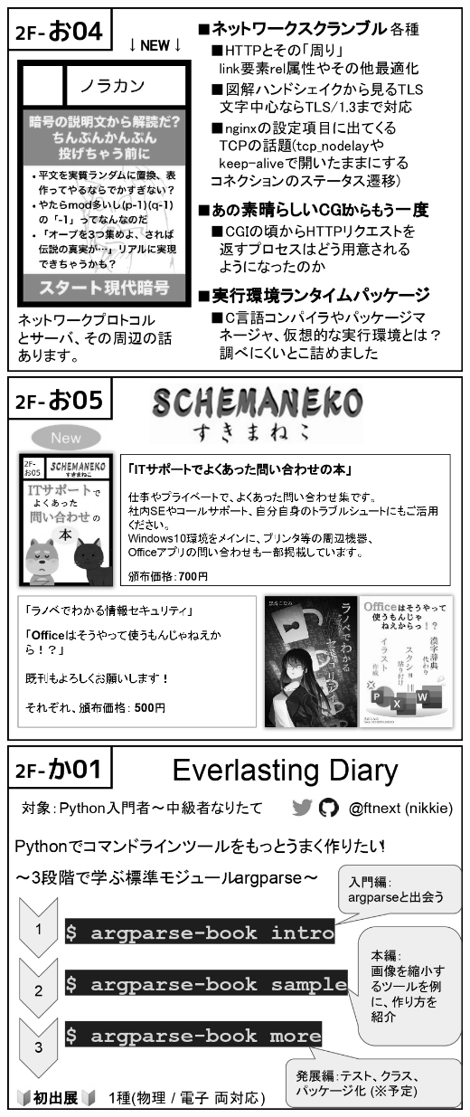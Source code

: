 \begin{center}
\includegraphics[width=0.9\linewidth]{images/circle-appeals/2F-お04.jpg}
\includegraphics[width=0.9\linewidth]{images/circle-appeals/2F-お05.jpg}
\includegraphics[width=0.9\linewidth]{images/circle-appeals/2F-か01.jpg}

\end{center}
